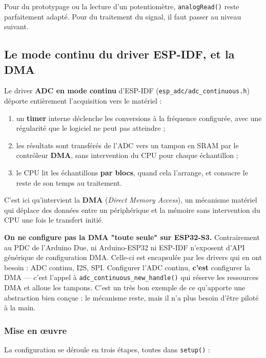 Pour du prototypage ou la lecture d'un potentiomètre, \texttt{analogRead()} reste parfaitement adapté. Pour du traitement du signal, il faut passer au niveau suivant.

\subsection{Le mode continu du driver ESP-IDF, et la DMA}

Le driver \textbf{ADC en mode continu} d'ESP-IDF (\texttt{esp\_adc/adc\_continuous.h}) déporte entièrement l'acquisition vers le matériel :

\begin{enumerate}
    \item un \textbf{timer} interne déclenche les conversions à la fréquence configurée, avec une régularité que le logiciel ne peut pas atteindre ;
    \item les résultats sont transférés de l'ADC vers un tampon en SRAM par le contrôleur \textbf{DMA}, sans intervention du CPU pour chaque échantillon ;
    \item le CPU lit les échantillons \textbf{par blocs}, quand cela l'arrange, et consacre le reste de son temps au traitement.
\end{enumerate}

C'est ici qu'intervient la \textbf{DMA} (\textit{Direct Memory Access}), un mécanisme matériel qui déplace des données entre un périphérique et la mémoire sans intervention du CPU une fois le transfert initié.

\begin{imp}
\textbf{On ne configure pas la DMA "toute seule" sur ESP32-S3.} Contrairement au PDC de l'Arduino Due, ni Arduino-ESP32 ni ESP-IDF n'exposent d'API générique de configuration DMA. Celle-ci est encapsulée par les drivers qui en ont besoin : ADC continu, I2S, SPI. Configurer l'ADC continu, \textbf{c'est} configurer la DMA — c'est l'appel à \texttt{adc\_continuous\_new\_handle()} qui réserve les ressources DMA et alloue les tampons. C'est un très bon exemple de ce qu'apporte une abstraction bien conçue : le mécanisme reste, mais il n'a plus besoin d'être piloté à la main.
\end{imp}

\subsubsection{Mise en \oe uvre}

La configuration se déroule en trois étapes, toutes dans \texttt{setup()} :

